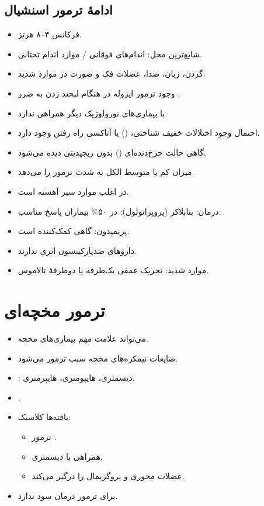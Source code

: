 \documentclass[a4paper,12pt]{extbook}
\begin{document}
\subsection*{ادامهٔ ترمور اسنشیال}
\begin{itemize}
\item فرکانس ۴–۸ هرتز.
\item شایع‌ترین محل: اندام‌های فوقانی /  موارد اندام تحتانی.
\item گردن، زبان، صدا، عضلات فک و صورت در موارد شدید.
\item وجود ترمور ایزوله در هنگام لبخند زدن به ضرر .
\item با بیماری‌های نورولوژیک دیگر همراهی ندارد.
\item احتمال وجود اختلالات خفیف شناختی،  () یا آتاکسی راه رفتن وجود دارد.
\item گاهی حالت چرخ‌دنده‌ای () بدون ریجیدیتی دیده می‌شود.
\item میزان کم یا متوسط الکل به شدت ترمور را \MDen{$\downarrow$} می‌دهد.
\item در اغلب موارد سیر آهسته است.
\item درمان: بتابلاکر (پروپرانولول): در ۵۰\% بیماران پاسخ مناسب.
\item پریمیدون: گاهی کمک‌کننده است.
\item داروهای ضدپارکینسون اثری ندارند.
\item موارد شدید: تحریک عمقی یک‌طرفه یا دوطرفهٔ تالاموس.
\end{itemize}
\section*{ترمور مخچه‌ای}
\begin{itemize}
\item می‌تواند علامت مهم بیماری‌های مخچه.
\item ضایعات نیمکره‌های مخچه سبب ترمور  می‌شود.
\item {}: دیسمتری، هایپومتری، هایپرمتری.
\item {}.
\item یافته‌ها کلاسیک:
\begin{itemize}
\item ترمور .
\item همراهی با دیسمتری.
\item عضلات محوری و پروگزیمال را درگیر می‌کند.
\end{itemize}
\item برای ترمور  درمان سود ندارد.
\end{itemize}
\end{document}
